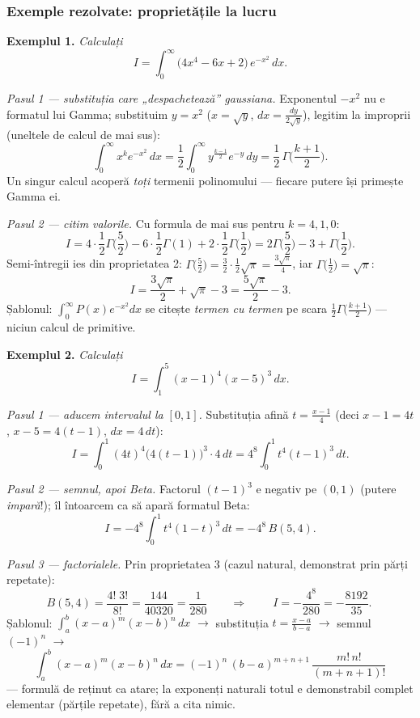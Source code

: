 \subsubsection*{Exemple rezolvate: proprietățile la lucru}

\textbf{Exemplul 1.} \emph{Calculați}
\[
I=\int_0^{\infty}\big(4x^{4}-6x+2\big)\,e^{-x^{2}}\,dx.
\]

\emph{Pasul 1 --- substituția care „despachetează'' gaussiana.} Exponentul $-x^2$ nu e formatul lui Gamma; substituim $y=x^{2}$ ($x=\sqrt y$, $dx=\frac{dy}{2\sqrt y}$), legitim la improprii (uneltele de calcul de mai sus):
\[
\int_0^\infty x^{k}e^{-x^2}\,dx=\frac12\int_0^\infty y^{\frac{k-1}{2}}e^{-y}\,dy=\frac12\,\Gamma\Big(\frac{k+1}{2}\Big).
\]
Un singur calcul acoperă \emph{toți} termenii polinomului --- fiecare putere își primește Gamma ei.

\emph{Pasul 2 --- citim valorile.} Cu formula de mai sus pentru $k=4,1,0$:
\[
I=4\cdot\frac12\Gamma\Big(\frac52\Big)-6\cdot\frac12\Gamma(1)+2\cdot\frac12\Gamma\Big(\frac12\Big)
=2\Gamma\Big(\frac52\Big)-3+\Gamma\Big(\frac12\Big).
\]
Semi-întregii ies din proprietatea 2: $\Gamma\big(\frac52\big)=\frac32\cdot\frac12\sqrt\pi=\frac{3\sqrt\pi}{4}$, iar $\Gamma\big(\frac12\big)=\sqrt\pi$:
\[
\boxed{\ I=\frac{3\sqrt\pi}{2}+\sqrt\pi-3=\frac{5\sqrt\pi}{2}-3.\ }
\]
Șablonul: $\int_0^\infty P(x)e^{-x^2}dx$ se citește \emph{termen cu termen} pe scara $\frac12\Gamma\big(\frac{k+1}2\big)$ --- niciun calcul de primitive.

\medskip
\textbf{Exemplul 2.} \emph{Calculați}
\[
I=\int_1^{5}(x-1)^{4}(x-5)^{3}\,dx.
\]

\emph{Pasul 1 --- aducem intervalul la $[0,1]$.} Substituția afină $t=\frac{x-1}{4}$ (deci $x-1=4t$, $x-5=4(t-1)$, $dx=4\,dt$):
\[
I=\int_0^1(4t)^4\big(4(t-1)\big)^3\cdot4\,dt=4^{8}\int_0^1t^{4}(t-1)^{3}\,dt.
\]

\emph{Pasul 2 --- semnul, apoi Beta.} Factorul $(t-1)^3$ e negativ pe $(0,1)$ (putere \emph{impară}!); îl întoarcem ca să apară formatul Beta:
\[
I=-4^{8}\int_0^1t^{4}(1-t)^{3}\,dt=-4^{8}\,B(5,4).
\]

\emph{Pasul 3 --- factorialele.} Prin proprietatea 3 (cazul natural, demonstrat prin părți repetate):
\[
B(5,4)=\frac{4!\;3!}{8!}=\frac{144}{40320}=\frac{1}{280}
\qquad\Longrightarrow\qquad
\boxed{\ I=-\frac{4^{8}}{280}=-\frac{8192}{35}.\ }
\]
Șablonul: $\int_a^b(x-a)^m(x-b)^n\,dx$ $\to$ substituția $t=\frac{x-a}{b-a}$ $\to$ semnul $(-1)^n$ $\to$
\[
\int_a^b(x-a)^m(x-b)^n\,dx=(-1)^n\,(b-a)^{m+n+1}\,\frac{m!\,n!}{(m+n+1)!}
\]
--- formulă de reținut ca atare; la exponenți naturali totul e demonstrabil complet elementar (părțile repetate), fără a cita nimic.


